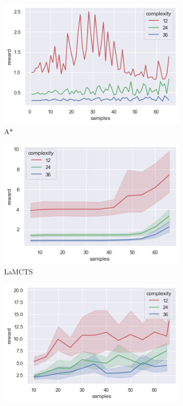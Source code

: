 \documentclass[bibliography=totoc]{scrartcl}
\begin{document}
\begin{figure}[H]
	\centering
	\begin{subfigure}[b]{0.3\linewidth}
		\includegraphics[width=\linewidth]{img/maze_sample_reward_astar.png}
        \caption{A*}	
    \end{subfigure}
	\hspace{0.02\textwidth}
	\begin{subfigure}[b]{0.3\linewidth}
		\includegraphics[width=\linewidth]{img/maze_sample_reward_lamcts.png}
		\caption{LaMCTS}
	\end{subfigure}
	\hspace{0.02\textwidth}
	\begin{subfigure}[b]{0.3\linewidth}
		\includegraphics[width=\linewidth]{img/maze_sample_reward_lap3.png}

\end{subfigure}
\end{figure}
\end{document}
